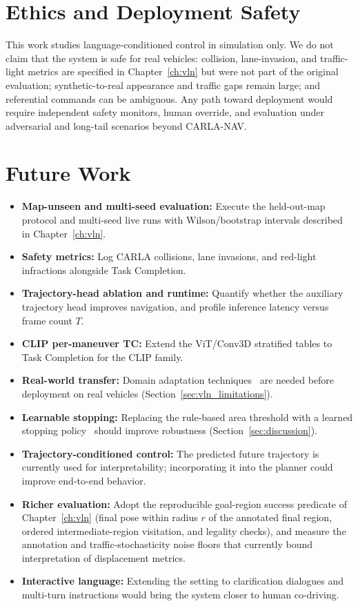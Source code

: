 \section{Ethics and Deployment Safety}

This work studies language-conditioned control in simulation only. We do not claim that the system is safe for real vehicles: collision, lane-invasion, and traffic-light metrics are specified in Chapter~\ref{ch:vln} but were not part of the original evaluation; synthetic-to-real appearance and traffic gaps remain large; and referential commands can be ambiguous. Any path toward deployment would require independent safety monitors, human override, and evaluation under adversarial and long-tail scenarios beyond CARLA-NAV.

\section{Future Work}

\begin{itemize}
    \item \textbf{Map-unseen and multi-seed evaluation:} Execute the held-out-map protocol and multi-seed live runs with Wilson/bootstrap intervals described in Chapter~\ref{ch:vln}.
    \item \textbf{Safety metrics:} Log CARLA collisions, lane invasions, and red-light infractions alongside Task Completion.
    \item \textbf{Trajectory-head ablation and runtime:} Quantify whether the auxiliary trajectory head improves navigation, and profile inference latency versus frame count $T$.
    \item \textbf{CLIP per-maneuver TC:} Extend the ViT/Conv3D stratified tables to Task Completion for the CLIP family.
    \item \textbf{Real-world transfer:} Domain adaptation techniques~\cite{kundu2021generalize,kang2020pixel} are needed before deployment on real vehicles (Section~\ref{sec:vln_limitations}).
    \item \textbf{Learnable stopping:} Replacing the rule-based area threshold with a learned stopping policy~\cite{xiang-etal-2020-learning} should improve robustness (Section~\ref{sec:discussion}).
    \item \textbf{Trajectory-conditioned control:} The predicted future trajectory is currently used for interpretability; incorporating it into the planner could improve end-to-end behavior.
    \item \textbf{Richer evaluation:} Adopt the reproducible goal-region success predicate of Chapter~\ref{ch:vln} (final pose within radius $r$ of the annotated final region, ordered intermediate-region visitation, and legality checks), and measure the annotation and traffic-stochasticity noise floors that currently bound interpretation of displacement metrics.
    \item \textbf{Interactive language:} Extending the setting to clarification dialogues and multi-turn instructions would bring the system closer to human co-driving.
\end{itemize}
